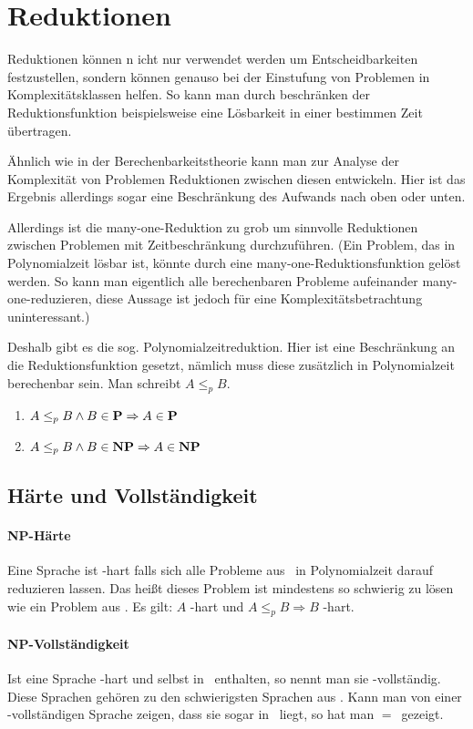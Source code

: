 \section{Reduktionen}
Reduktionen können n icht nur verwendet werden um Entscheidbarkeiten festzustellen, sondern können genauso bei der Einstufung von Problemen in Komplexitätsklassen helfen. So kann man durch beschränken der Reduktionsfunktion beispielsweise eine Lösbarkeit in einer bestimmen Zeit übertragen.

Ähnlich wie in der Berechenbarkeitstheorie kann man zur Analyse der Komplexität von Problemen Reduktionen zwischen diesen entwickeln. Hier ist das Ergebnis allerdings sogar eine Beschränkung des Aufwands nach oben oder unten.



Allerdings ist die many-one-Reduktion zu grob um sinnvolle Reduktionen zwischen Problemen mit Zeitbeschränkung durchzuführen. {\scriptsize(Ein Problem, das in Polynomialzeit lösbar ist, könnte durch eine many-one-Reduktionsfunktion gelöst werden. So kann man eigentlich alle berechenbaren Probleme aufeinander many-one-reduzieren, diese Aussage ist jedoch für eine Komplexitätsbetrachtung uninteressant.)}

Deshalb gibt es die sog. Polynomialzeitreduktion. Hier ist eine Beschränkung an die Reduktionsfunktion gesetzt, nämlich muss diese zusätzlich in Polynomialzeit berechenbar sein. Man schreibt $A\leq_p B$.
\begin{enumerate}
	\item $A\leq_p B\wedge B\in \text{\textbf{P}}\Rightarrow A\in\text{\textbf{P}}$
	\item $A\leq_p B\wedge B\in \text{\textbf{NP}}\Rightarrow A\in\text{\textbf{NP}}$
\end{enumerate}


\subsection{Härte und Vollständigkeit}
\paragraph{NP-Härte}
Eine Sprache ist \npoly-hart falls sich alle Probleme aus \npoly\ in Polynomialzeit darauf reduzieren lassen. Das heißt dieses Problem ist mindestens so schwierig zu lösen wie ein Problem aus \npoly. Es gilt: $A$ \npoly-hart und $A\leq_p B\Rightarrow B$ \npoly-hart.
\paragraph{NP-Vollständigkeit}
Ist eine Sprache \npoly-hart und selbst in \npoly\ enthalten, so nennt man sie \npoly-vollständig. Diese Sprachen gehören zu den schwierigsten Sprachen aus \npoly. Kann man von einer \npoly-vollständigen Sprache zeigen, dass sie sogar in \poly\ liegt, so hat man \poly$=$\npoly\ gezeigt.

